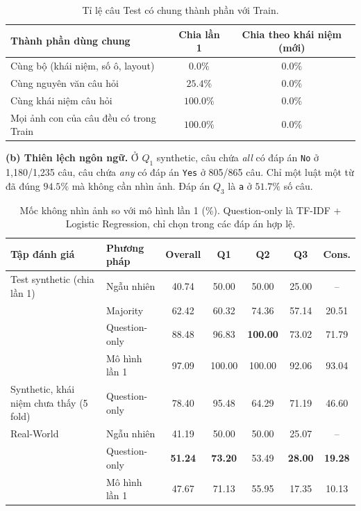 \documentclass[12pt]{ai_conquer2026}
\begin{document}
\begin{table}[h!]
\centering
\small
\caption{Tỉ lệ câu Test có chung thành phần với Train.}
\label{tab:leak}
\begin{tabular}{|l|c|c|}
\hline
\textbf{Thành phần dùng chung} & \textbf{Chia lần 1} & \textbf{Chia theo khái niệm (mới)} \\ \hline
Cùng bộ (khái niệm, số ô, layout) & $0.0\%$ & $0.0\%$ \\
Cùng nguyên văn câu hỏi & $25.4\%$ & $0.0\%$ \\
Cùng khái niệm câu hỏi & $\mathbf{100.0\%}$ & $0.0\%$ \\
Mọi ảnh con của câu đều có trong Train & $\mathbf{100.0\%}$ & $0.0\%$ \\ \hline
\end{tabular}
\end{table}

\textbf{(b) Thiên lệch ngôn ngữ.} Ở $Q_1$ synthetic, câu chứa \emph{all} có đáp án \texttt{No} ở 1{,}180/1{,}235 câu, câu chứa \emph{any} có đáp án \texttt{Yes} ở 805/865 câu. Chỉ một luật một từ đã đúng $94.5\%$ mà không cần nhìn ảnh. Đáp án $Q_3$ là \texttt{a} ở $51.7\%$ số câu.

\begin{table}[h!]
\centering
\small
\caption{Mốc không nhìn ảnh so với mô hình lần 1 (\%). Question-only là TF-IDF + Logistic Regression, chỉ chọn trong các đáp án hợp lệ.}
\label{tab:blind}
\begin{tabular}{|l|l|c|c|c|c|c|}
\hline
\textbf{Tập đánh giá} & \textbf{Phương pháp} & \textbf{Overall} & \textbf{Q1} & \textbf{Q2} & \textbf{Q3} & \textbf{Cons.} \\ \hline
Test synthetic (chia lần 1) & Ngẫu nhiên & 40.74 & 50.00 & 50.00 & 25.00 & -- \\
 & Majority & 62.42 & 60.32 & 74.36 & 57.14 & 20.51 \\
 & Question-only & 88.48 & 96.83 & \textbf{100.00} & 73.02 & 71.79 \\
 & Mô hình lần 1 & 97.09 & 100.00 & 100.00 & 92.06 & 93.04 \\ \hline
Synthetic, khái niệm chưa thấy (5 fold) & Question-only & 78.40 & 95.48 & 64.29 & 71.19 & 46.60 \\ \hline
Real-World & Ngẫu nhiên & 41.19 & 50.00 & 50.00 & 25.07 & -- \\
 & Question-only & \textbf{51.24} & \textbf{73.20} & 53.49 & \textbf{28.00} & \textbf{19.28} \\
 & Mô hình lần 1 & 47.67 & 71.13 & 55.95 & 17.35 & 10.13 \\ \hline
\end{tabular}
\end{table}
\end{document}
